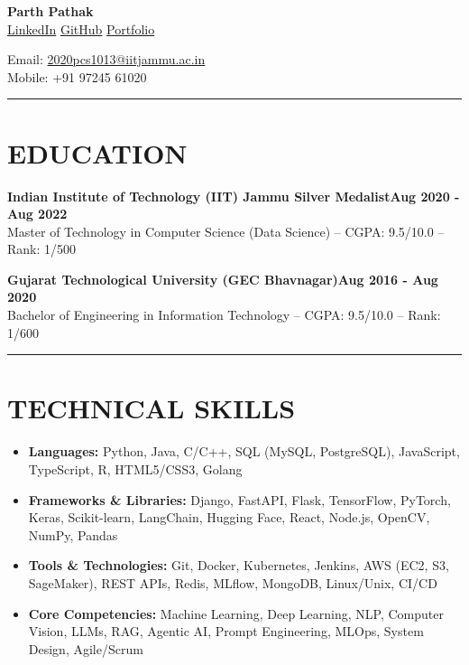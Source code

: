 \documentclass[10pt,a4paper]{article}
\begin{document}
\noindent
\begin{minipage}[t]{0.5\textwidth}
    \textbf{Parth Pathak}\\[0.5pt]
    {\small\href{https://linkedin.com/in/parthsompura}{\color{linkcolor}LinkedIn} \textbf{\textbar{}} \href{https://github.com/parthsompura}{\color{linkcolor}GitHub} \textbf{\textbar{}} \href{https://parthcseiitian.wixsite.com/parth}{\color{linkcolor}Portfolio}}
\end{minipage}%
\begin{minipage}[t]{0.5\textwidth}
\raggedleft
    {\small Email: \href{mailto:2020pcs1013@iitjammu.ac.in}{2020pcs1013@iitjammu.ac.in}}\\[4pt]
    {\small Mobile: +91 97245 61020}
\end{minipage}

\vspace{2pt}
\noindent\rule{\textwidth}{0.8pt}

\section*{EDUCATION}

\noindent
{\small\textbf{Indian Institute of Technology (IIT) Jammu \textbf{\textbar{}} Silver Medalist}}\hfill{\small\textbf{Aug 2020 - Aug 2022}}\\[-2pt]
{\small Master of Technology in Computer Science (Data Science) -- CGPA: 9.5/10.0 -- Rank: 1/500}

\vspace{3pt}
\noindent
{\small\textbf{Gujarat Technological University (GEC Bhavnagar)}}\hfill{\small\textbf{Aug 2016 - Aug 2020}}\\[-2pt]
{\small Bachelor of Engineering in Information Technology -- CGPA: 9.5/10.0 -- Rank: 1/600}

\vspace{2pt}
\noindent\rule{\textwidth}{0.8pt}

\section*{TECHNICAL SKILLS}

{\small
\begin{itemize}[leftmargin=0.15in, itemsep=1.5pt, topsep=0pt, parsep=0pt, partopsep=0pt, label=$\bullet$]
    \item \textbf{Languages:} Python, Java, C/C++, SQL (MySQL, PostgreSQL), JavaScript, TypeScript, R, HTML5/CSS3, Golang
    \item \textbf{Frameworks \& Libraries:} Django, FastAPI, Flask, TensorFlow, PyTorch, Keras, Scikit-learn, LangChain, Hugging Face, React, Node.js, OpenCV, NumPy, Pandas
    \item \textbf{Tools \& Technologies:} Git, Docker, Kubernetes, Jenkins, AWS (EC2, S3, SageMaker), REST APIs, Redis, MLflow, MongoDB, Linux/Unix, CI/CD
    \item \textbf{Core Competencies:} Machine Learning, Deep Learning, NLP, Computer Vision, LLMs, RAG, Agentic AI, Prompt Engineering, MLOps, System Design, Agile/Scrum
\end{itemize}
}
\end{document}
